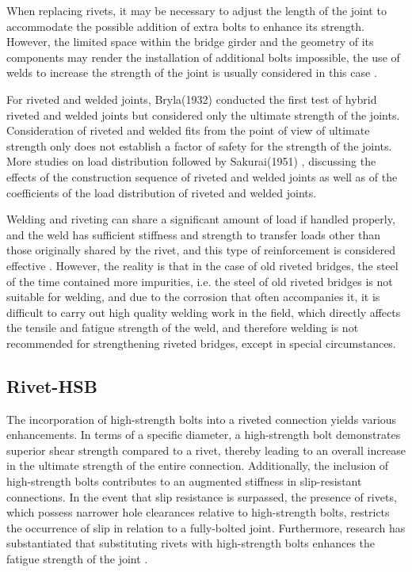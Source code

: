 When replacing rivets, it may be necessary to adjust the length of the joint to accommodate the possible addition of extra bolts to enhance its strength. However, the limited space within the bridge girder and the geometry of its components may render the installation of additional bolts impossible, the use of welds to increase the strength of the joint is usually considered in this case \cite{Thomas2000}.

For riveted and welded joints, Bryla(1932)\cite{bryla1932Tests} conducted the first test of hybrid riveted and welded joints but considered only the ultimate strength of the joints. Consideration of riveted and welded fits from the point of view of ultimate strength only does not establish a factor of safety for the strength of the joints. More studies on load distribution followed by Sakurai(1951) \cite{sakurai1951Experimental}, discussing the effects of the construction sequence of riveted and welded joints as well as of the coefficients of the load distribution of riveted and welded joints.

Welding and riveting can share a significant amount of load if handled properly, and the weld has sufficient stiffness and strength to transfer loads other than those originally shared by the rivet, and this type of reinforcement is considered effective \cite{young1934Relative,hiroshi2001Experimental,meier2000composite}. However, the reality is that in the case of old riveted bridges, the steel of the time contained more impurities, i.e. the steel of old riveted bridges is not suitable for welding, and due to the corrosion that often accompanies it, it is difficult to carry out high quality welding work in the field, which directly affects the tensile and fatigue strength of the weld, and therefore welding is not recommended for strengthening riveted bridges, except in special circumstances.

\subsection{Rivet-HSB}

The incorporation of high-strength bolts into a riveted connection yields various enhancements. In terms of a specific diameter, a high-strength bolt demonstrates superior shear strength compared to a rivet, thereby leading to an overall increase in the ultimate strength of the entire connection. Additionally, the inclusion of high-strength bolts contributes to an augmented stiffness in slip-resistant connections. In the event that slip resistance is surpassed, the presence of rivets, which possess narrower hole clearances relative to high-strength bolts, restricts the occurrence of slip in relation to a fully-bolted joint. Furthermore, research has substantiated that substituting rivets with high-strength bolts enhances the fatigue strength of the joint \cite{reemsnyder1975Fatigue}.

